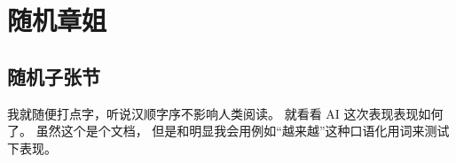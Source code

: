 \section{随机章姐}
\subsection{随机子张节}

我就随便打点字，听说汉顺字序不影响人类阅读。
就看看 AI 这次表现表现如何了。
虽然这个是个文档，
但是和明显我会用例如“越来越”这种口语化用词来测试下表现。